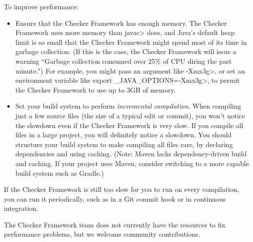 To improve performance:
\begin{itemize}
\item
  Ensure that the Checker Framework has enough memory.  The Checker
  Framework uses more memory than \<javac> does, and Java's default heap
  limit is so small that the Checker Framework might spend most of its time
  in garbage collection.  (If this is the case, the Checker Framework will
  issue a warning ``Garbage collection consumed over 25\% of CPU diring the
  past minute.")  For example, you might pass an argument like
  \<-Xmx3g>, or set an environment variable like \<export
  \_JAVA\_OPTIONS=-Xmx3g>, to permit the Checker Framework to use up to 3GB
  of memory.
\item
  Set your build system to perform \emph{incremental compilation}.  When
  compiling just a few source files (the size of a typical edit or commit),
  you won't notice the slowdown even if the Checker Framework is very slow.
  If you compile all files in a large project, you will definitely notice a
  slowdown.  You should structure your build system to make compiling all
  files rare, by declaring dependencies and using caching.
  (Note: Maven lacks dependency-driven build and caching.  If your project
  uses Maven, consider switching to a more capable build system such as Gradle.)
\end{itemize}

If the Checker Framework is still too slow for you to run on every compilation,
you can run it periodically, such as in a Git commit hook or in continuous
integration.

The Checker Framework team does not currently have the resources to fix
performance problems, but we welcome community contributions.

